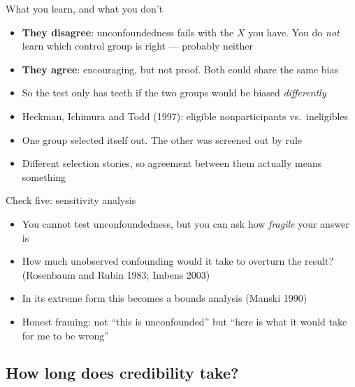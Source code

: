 \documentclass{beamer}
\begin{document}
\begin{frame}{What you learn, and what you don't}

\begin{itemize}
\item \textbf{They disagree}: unconfoundedness fails with the $X$ you have. You do \emph{not} learn which control group is right --- probably neither
\item \textbf{They agree}: encouraging, but not proof. Both could share the same bias
\end{itemize}

\vspace{0.6em}

\begin{itemize}
\item So the test only has teeth if the two groups would be biased \emph{differently}
\item Heckman, Ichimura and Todd (1997): eligible nonparticipants vs.\ ineligibles
\item One group selected itself out. The other was screened out by rule
\item Different selection stories, so agreement between them actually means something
\end{itemize}

\end{frame}


\begin{frame}{Check five: sensitivity analysis}

\begin{itemize}
\item You cannot test unconfoundedness, but you can ask how \emph{fragile} your answer is
\item How much unobserved confounding would it take to overturn the result? (Rosenbaum and Rubin 1983; Imbens 2003)
\item In its extreme form this becomes a bounds analysis (Manski 1990)
\item Honest framing: not ``this is unconfounded'' but ``here is what it would take for me to be wrong''
\end{itemize}

\end{frame}


\subsection{How long does credibility take?}
\end{document}
